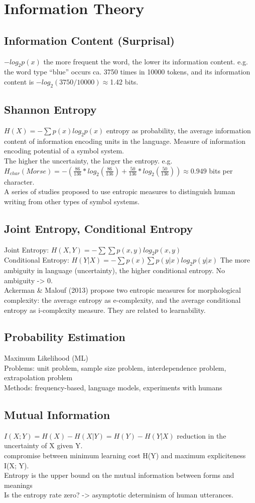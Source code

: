 \section{Information Theory}
\subsection*{Information Content (Surprisal)}
$-log_2 p(x)$ {\tiny the more frequent the word, the lower its information content.
e.g. the word type “blue” occurs ca. 3750 times in 10000 tokens, and its information content is $-log_2(3750/10000) \approx$1.42 bits.}
\subsection*{Shannon Entropy}
$H(X) = - \sum p(x) log_2 p(x)$ {\tiny entropy as probability, the average information content of information encoding units in the language. Measure of information encoding potential of a symbol system.}\\
{\tiny The higher the uncertainty, the larger the entropy. e.g. $H_{char}(Morse) = - (\frac{86}{136} * log_2(\frac{86}{136}) + \frac{50}{136} * log_2(\frac{50}{136})) \approx 0.949$ bits per character.} \\
{\tiny A series of studies proposed to use entropic measures to distinguish human writing from other types of symbol systems.}
\subsection*{Joint Entropy, Conditional Entropy}
{\scriptsize Joint Entropy:} $H(X, Y) = - \sum \sum p(x, y) log_2 p(x, y)$ \\
{\scriptsize Conditional Entropy:} $H(Y|X) = - \sum p(x) \sum p(y|x) log_2 p(y|x)$ {\tiny The more ambiguity in language (uncertainty), the higher conditional entropy. No ambiguity -> 0.}\\
{\tiny Ackerman \& Malouf (2013) propose two entropic measures for morphological complexity: the average entropy as e-complexity, and the average conditional entropy as i-complexity measure. They are related to learnability.}
\subsection*{Probability Estimation}
{\scriptsize Maximum Likelihood (ML) \\
Problems: unit problem, sample size problem, interdependence problem, extrapolation problem \\
Methods: frequency-based, language models, experiments with humans}
\subsection*{Mutual Information}
$I(X; Y) = H(X) - H(X|Y) = H(Y) - H(Y|X)$ {\tiny reduction in the uncertainty of X given Y. \\
compromise between minimum learning cost H(Y) and maximum expliciteness I(X; Y). \\
Entropy is the upper bound on the mutual information between forms and meanings \\
Is the entropy rate zero? -> asymptotic determinism of human utterances.}